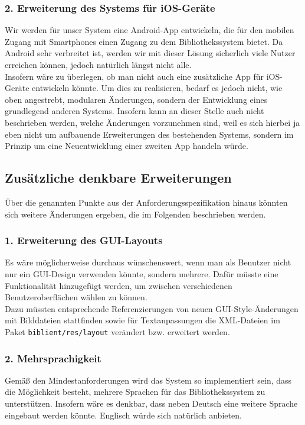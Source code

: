 \documentclass[fontsize=12pt,paper=a4,twoside]{scrartcl}
\begin{document}
\subsubsection*{2. Erweiterung des Systems für iOS-Geräte}

Wir werden für unser System eine Android-App entwickeln, die für den mobilen Zugang mit Smartphones einen Zugang zu dem Bibliothekssystem bietet. Da Android sehr verbreitet ist, werden wir mit dieser Lösung sicherlich viele Nutzer erreichen können, jedoch natürlich längst nicht alle. \\
Insofern wäre zu überlegen, ob man nicht auch eine zusätzliche App für iOS-Geräte entwickeln könnte. Um dies zu realisieren, bedarf es jedoch nicht, wie oben angestrebt, modularen Änderungen, sondern der Entwicklung eines grundlegend anderen Systems. Insofern kann an dieser Stelle auch nicht beschrieben werden, welche Änderungen vorzunehmen sind, weil es sich hierbei ja eben nicht um aufbauende Erweiterungen des bestehenden Systems, sondern im Prinzip um eine Neuentwicklung einer zweiten App handeln  würde.

\subsection*{Zusätzliche denkbare Erweiterungen}

Über die genannten Punkte aus der Anforderungsspezifikation hinaus könnten sich weitere Änderungen ergeben, die im Folgenden beschrieben werden.

\subsubsection*{1. Erweiterung des GUI-Layouts}

Es wäre möglicherweise durchaus wünschenswert, wenn man als Benutzer nicht nur ein GUI-Design verwenden könnte, sondern mehrere. Dafür müsste eine Funktionalität hinzugefügt werden, um zwischen verschiedenen Benutzeroberflächen wählen zu können. \\
Dazu müssten entsprechende Referenzierungen von neuen GUI-Style-Änderungen mit Bilddateien stattfinden sowie für Textanpassungen die XML-Dateien im Paket \texttt{biblient/res/layout} verändert bzw. erweitert werden. 

\subsubsection*{2. Mehrsprachigkeit}

Gemäß den Mindestanforderungen wird das System so implementiert sein, dass die Möglichkeit besteht, mehrere Sprachen für das Bibliothekssystem zu unterstützen. Insofern wäre es denkbar, dass neben Deutsch eine weitere Sprache eingebaut werden könnte. Englisch würde sich natürlich anbieten.
\end{document}
